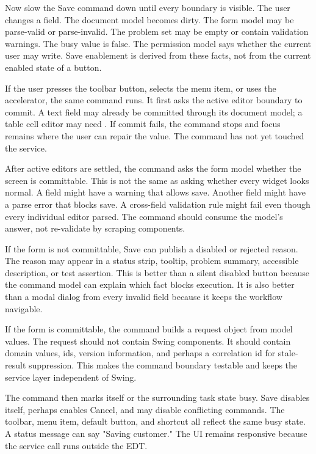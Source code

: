Now slow the Save command down until every boundary is visible. The user changes a field. The document model becomes dirty. The form model may be parse-valid or parse-invalid. The problem set may be empty or contain validation warnings. The busy value is false. The permission model says whether the current user may write. Save enablement is derived from these facts, not from the current enabled state of a button.

If the user presses the toolbar button, selects the menu item, or uses the accelerator, the same command runs. It first asks the active editor boundary to commit. A text field may already be committed through its document model; a table cell editor may need . If commit fails, the command stops and focus remains where the user can repair the value. The command has not yet touched the service.

After active editors are settled, the command asks the form model whether the screen is committable. This is not the same as asking whether every widget looks normal. A field might have a warning that allows save. Another field might have a parse error that blocks save. A cross-field validation rule might fail even though every individual editor parsed. The command should consume the model's answer, not re-validate by scraping components.

If the form is not committable, Save can publish a disabled or rejected reason. The reason may appear in a status strip, tooltip, problem summary, accessible description, or test assertion. This is better than a silent disabled button because the command model can explain which fact blocks execution. It is also better than a modal dialog from every invalid field because it keeps the workflow navigable.

If the form is committable, the command builds a request object from model values. The request should not contain Swing components. It should contain domain values, ids, version information, and perhaps a correlation id for stale-result suppression. This makes the command boundary testable and keeps the service layer independent of Swing.

The command then marks itself or the surrounding task state busy. Save disables itself, perhaps enables Cancel, and may disable conflicting commands. The toolbar, menu item, default button, and shortcut all reflect the same busy state. A status message can say "Saving customer." The UI remains responsive because the service call runs outside the EDT.

